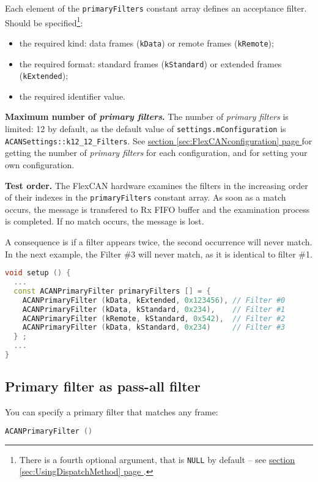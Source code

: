 \documentclass[9pt, a4paper, obeyspaces, openany]{extarticle}
\newcommand\refSectionPage[1]{\hyperref[sec:#1]{section \ref*{sec:#1} page \pageref{sec:#1}}}
\newcommand \subsectionLabel[2]{\subsection{#1}\label{subsec:#2}}
\begin{document}
Each element of the \texttt{primaryFilters} constant array defines an acceptance filter. Should be specified\footnote{There is a fourth optional argument, that is \texttt{NULL} by default -- see \refSectionPage{UsingDispatchMethod}.}:
\begin{itemize}
  \item the required kind: data frames (\texttt{kData}) or remote frames (\texttt{kRemote});
  \item the required format: standard frames (\texttt{kStandard}) or extended frames (\texttt{kExtended});
  \item the required identifier value.
\end{itemize}


{\bf Maximum number of \emph{primary filters}.} The number of \emph{primary filters} is limited: 12 by default, as the default value of \texttt{settings.mConfiguration} is \texttt{ACANSettings::k12\_12\_Filters}. See \refSectionPage{FlexCANconfiguration} for getting the number of \emph{primary filters} for each configuration, and for setting your own configuration.

{\bf Test order.} The FlexCAN hardware examines the filters in the increasing order of their indexes in the \texttt{primaryFilters} constant array. As soon as a match occurs, the message is transfered to Rx FIFO buffer and the examination process is completed. If no match occurs, the message is lost.

A consequence is if a filter appears twice, the second occurrence will never match. In the next example, the Filter \#3 will never match, as it is identical to filter \#1.

{ \small\begin{lstlisting}[language=c++]
void setup () {
  ...
  const ACANPrimaryFilter primaryFilters [] = {
    ACANPrimaryFilter (kData, kExtended, 0x123456), // Filter #0
    ACANPrimaryFilter (kData, kStandard, 0x234),    // Filter #1
    ACANPrimaryFilter (kRemote, kStandard, 0x542),  // Filter #2
    ACANPrimaryFilter (kData, kStandard, 0x234)     // Filter #3
  } ;
  ...
}
\end{lstlisting}}



\subsectionLabel{Primary filter as pass-all filter}{passAllPrimaryFilter}

You can specify a primary filter that matches any frame: 
{ \small\begin{lstlisting}[language=c++]
    ACANPrimaryFilter ()
\end{lstlisting}}
\end{document}

